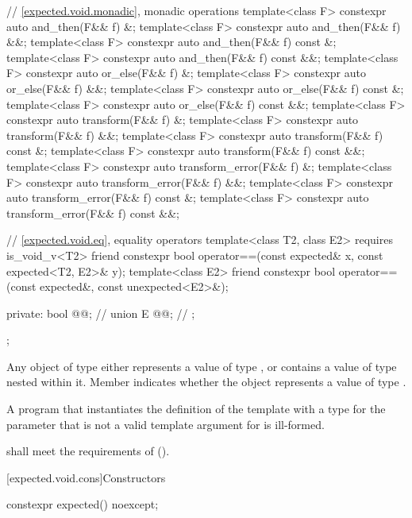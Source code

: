 \begin{codeblock}
{{    // \ref{expected.void.monadic}, monadic operations
    template<class F> constexpr auto and_then(F&& f) &;
    template<class F> constexpr auto and_then(F&& f) &&;
    template<class F> constexpr auto and_then(F&& f) const &;
    template<class F> constexpr auto and_then(F&& f) const &&;
    template<class F> constexpr auto or_else(F&& f) &;
    template<class F> constexpr auto or_else(F&& f) &&;
    template<class F> constexpr auto or_else(F&& f) const &;
    template<class F> constexpr auto or_else(F&& f) const &&;
    template<class F> constexpr auto transform(F&& f) &;
    template<class F> constexpr auto transform(F&& f) &&;
    template<class F> constexpr auto transform(F&& f) const &;
    template<class F> constexpr auto transform(F&& f) const &&;
    template<class F> constexpr auto transform_error(F&& f) &;
    template<class F> constexpr auto transform_error(F&& f) &&;
    template<class F> constexpr auto transform_error(F&& f) const &;
    template<class F> constexpr auto transform_error(F&& f) const &&;

    // \ref{expected.void.eq}, equality operators
    template<class T2, class E2> requires is_void_v<T2>
      friend constexpr bool operator==(const expected& x, const expected<T2, E2>& y);
    template<class E2>
      friend constexpr bool operator==(const expected&, const unexpected<E2>&);

  private:
    bool @@;       // \expos
    union {
      E @@;           // \expos
    };
  };
}
\end{codeblock}

\pnum
Any object of type  either
represents a value of type , or
contains a value of type 
nested within it.
Member  indicates whether the  object
represents a value of type .

\pnum
A program that instantiates
the definition of the template  with
a type for the  parameter that
is not a valid template argument for  is ill-formed.

\pnum
{} shall meet the requirements of
 ().

[expected.void.cons]{Constructors}

%
\begin{itemdecl}
constexpr expected() noexcept;
\end{itemdecl}

